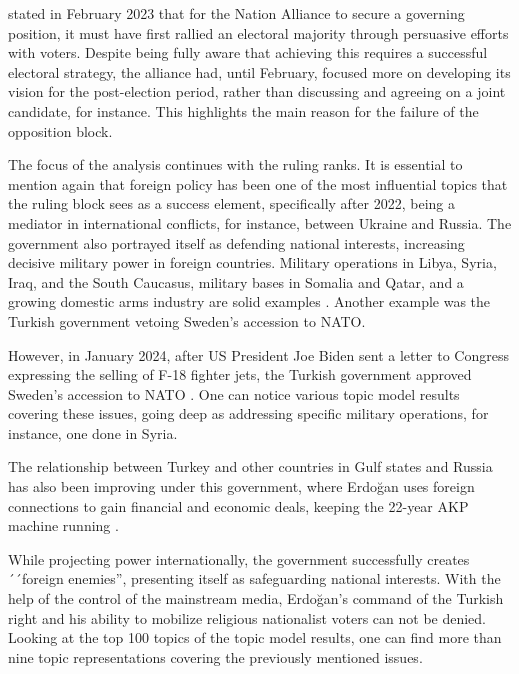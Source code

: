 \textcite{edgar_sar_opposition_election_agenda_2023} stated in February 2023 that for the Nation Alliance to 
secure a governing position, it must have first rallied an electoral majority through persuasive efforts 
with voters. Despite being fully aware that achieving this requires a successful electoral strategy, the 
alliance had, until February, focused more on developing its vision for the post-election period, rather 
than discussing and agreeing on a joint candidate, for instance. This highlights the main reason for the 
failure of the opposition block.

The focus of the analysis continues with the ruling ranks. It is essential to mention again that 
foreign policy has been one of the most influential topics that the ruling block sees as a success 
element, specifically after 2022, being a mediator in international conflicts, for instance, between 
Ukraine and Russia. The government also portrayed itself as defending national interests, increasing 
decisive military power in foreign countries. Mili­tary operations in Libya, Syria, Iraq, and the 
South Caucasus, military bases in Somalia and Qatar, and a growing domestic arms industry are solid 
examples \parencite{cevik_aksoy_turkey_earthquake_2023}. Another example was the Turkish government 
vetoing Sweden's accession to NATO. 

However, in January 2024, after US President Joe Biden sent a letter to Congress expressing the 
selling of F-18 fighter jets, the Turkish government approved Sweden's accession to 
NATO \parencite{euronews_sweden_f18_2024}. One can notice various topic model results covering 
these issues, going deep as addressing specific military operations, for instance, one done in Syria.

The relationship between Turkey and other countries in Gulf states and Russia has also been improving 
under this government, where Erdo­ğan uses foreign connections to gain financial and economic deals, 
keeping the 22-year AKP machine running \parencite{cevik_aksoy_aydin_turkey_after_elections_2023}.

While projecting power internationally, the government successfully creates ´´foreign enemies'', 
presenting itself as safeguarding national interests. With the help of the control of the mainstream 
media, Erdoğan's command of the Turkish right and his ability to mobilize religious nationalist 
voters can not be denied. Looking at the top 100 topics of the topic model results, one can find more 
than nine topic representations covering the previously mentioned issues. 

